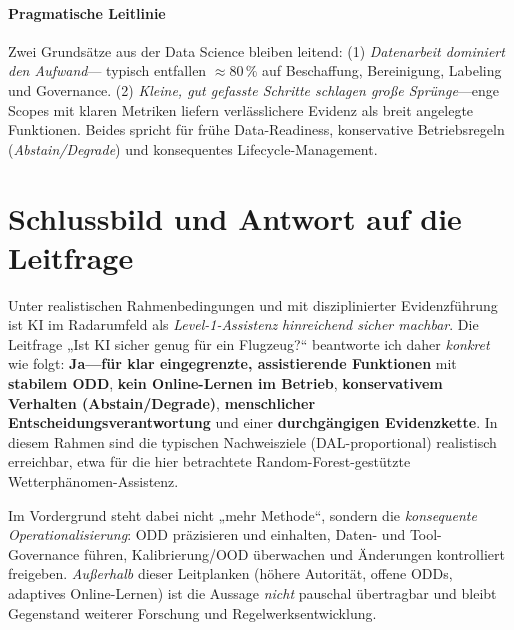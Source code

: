 \paragraph{Pragmatische Leitlinie}
Zwei Grundsätze aus der Data Science bleiben leitend: (1) \emph{Datenarbeit dominiert den Aufwand}— typisch entfallen 
\(\approx 80\,\%\) auf Beschaffung, Bereinigung, Labeling und Governance. (2) \emph{Kleine, gut gefasste Schritte 
schlagen große Sprünge}—enge Scopes mit klaren Metriken liefern verlässlichere Evidenz als breit angelegte Funktionen. 
Beides spricht für frühe Data-Readiness, konservative Betriebsregeln (\emph{Abstain/Degrade}) und konsequentes 
Lifecycle-Management.

\section{Schlussbild und Antwort auf die Leitfrage}
Unter realistischen Rahmenbedingungen und mit disziplinierter Evidenzführung ist KI im Radarumfeld als
\emph{Level-1-Assistenz} \emph{hinreichend sicher machbar}. Die Leitfrage „Ist KI sicher genug für ein Flugzeug?“
beantworte ich daher \emph{konkret} wie folgt: \textbf{Ja—für klar eingegrenzte, assistierende Funktionen} mit
\textbf{stabilem ODD}, \textbf{kein Online-Lernen im Betrieb}, \textbf{konservativem Verhalten (Abstain/Degrade)},
\textbf{menschlicher Entscheidungsverantwortung} und einer \textbf{durchgängigen Evidenzkette}. 
In diesem Rahmen sind die typischen Nachweisziele (DAL-proportional) realistisch erreichbar, etwa für die hier
betrachtete Random-Forest-gestützte Wetterphänomen-Assistenz.

Im Vordergrund steht dabei nicht „mehr Methode“, sondern die \emph{konsequente Operationalisierung}:
ODD präzisieren und einhalten, Daten- und Tool-Governance führen, Kalibrierung/OOD überwachen und Änderungen
kontrolliert freigeben. \emph{Außerhalb} dieser Leitplanken (höhere Autorität, offene ODDs, adaptives Online-Lernen)
ist die Aussage \emph{nicht} pauschal übertragbar und bleibt Gegenstand weiterer Forschung und Regelwerksentwicklung.
